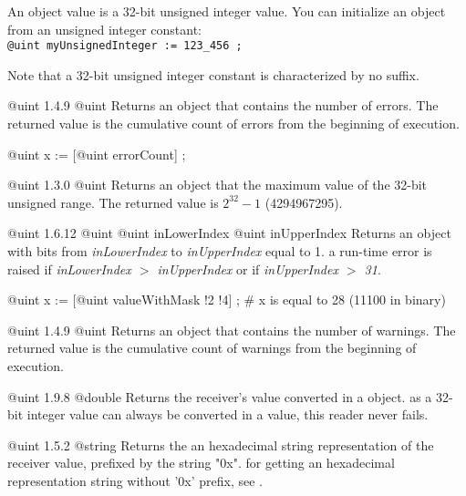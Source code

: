 
An  object value is a 32-bit unsigned integer value. You can initialize an  object from an unsigned integer constant:\\

\texttt{@uint myUnsignedInteger := 123\_456 ;}

Note that a 32-bit unsigned integer constant is characterized by no suffix.


{@uint}
{1.4.9}
{@uint}
{Returns an  object that contains the number of errors.}
{The returned value is the cumulative count of errors from the beginning of execution.}

\exempleUneLigne
{}
{@uint x := [@uint errorCount] ;}

{@uint}
{1.3.0}
{@uint}
{Returns an  object that the maximum value of the 32-bit unsigned range.}
{The returned value is $2^{32}-1$ (4294967295).}


{@uint}
{1.6.12}
{@uint}
{@uint inLowerIndex}
{@uint inUpperIndex}
{Returns an  object with bits from \emph{inLowerIndex} to \emph{inUpperIndex} equal to 1.}
{a run-time error is raised if \emph{inLowerIndex $>$ inUpperIndex} or if \emph{inUpperIndex $>$ 31}.}


\exempleUneLigne
{}
{@uint x := [@uint valueWithMask !2 !4] ; \# x is equal to 28 (11100 in binary)}





{@uint}
{1.4.9}
{@uint}
{Returns an  object that contains the number of warnings.}
{The returned value is the cumulative count of warnings from the beginning of execution.}



{@uint}
{1.9.8}
{@double}
{Returns the receiver's value converted in a  object.}
{as a 32-bit integer value can always be converted in a  value, this reader never fails.}



{@uint}
{1.5.2}
{@string}
{Returns the an hexadecimal string representation of the receiver value, prefixed by the string "0x".}
{for getting an hexadecimal representation string without '0x' prefix, see .}



